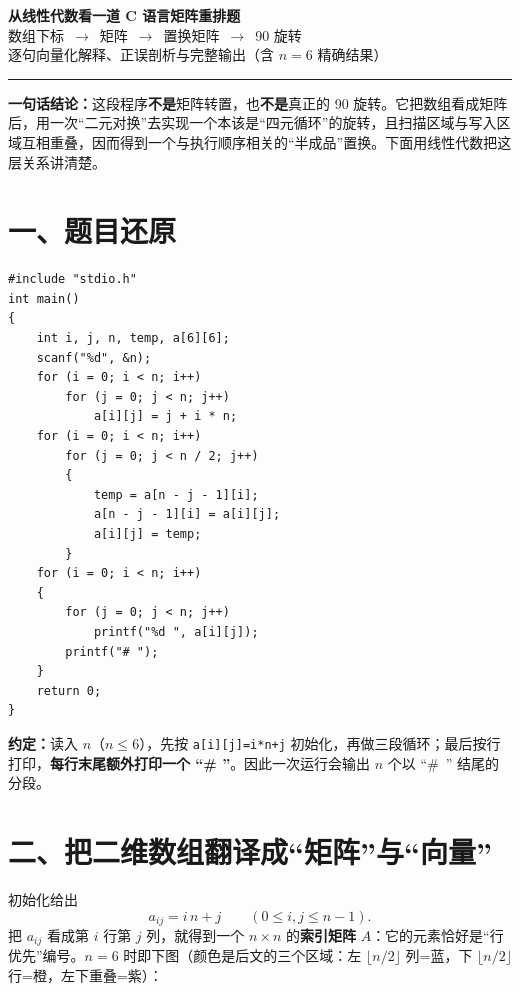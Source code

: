 \documentclass[11pt,a4paper,UTF8]{ctexart}
\begin{document}
\begin{center}
{\LARGE\bfseries 从线性代数看一道 C 语言矩阵重排题}\\[5pt]
{\large 数组下标 \,$\to$\, 矩阵 \,$\to$\, 置换矩阵 \,$\to$\, 90\textdegree{} 旋转}\\[5pt]
{\small 逐句向量化解释、正误剖析与完整输出（含 $n=6$ 精确结果）}
\end{center}
\vspace{-2pt}
\noindent\rule{\linewidth}{0.8pt}

\begin{keybox}
\textbf{一句话结论：}这段程序\textbf{不是}矩阵转置，也\textbf{不是}真正的 90\textdegree{} 旋转。它把数组看成矩阵后，用一次“二元对换”去实现一个本该是“四元循环”的旋转，且扫描区域与写入区域互相重叠，因而得到一个与执行顺序相关的“半成品”置换。下面用线性代数把这层关系讲清楚。
\end{keybox}

\section*{一、题目还原}

\begin{lstlisting}
#include "stdio.h"
int main()
{
    int i, j, n, temp, a[6][6];
    scanf("%d", &n);
    for (i = 0; i < n; i++)
        for (j = 0; j < n; j++)
            a[i][j] = j + i * n;
    for (i = 0; i < n; i++)
        for (j = 0; j < n / 2; j++)
        {
            temp = a[n - j - 1][i];
            a[n - j - 1][i] = a[i][j];
            a[i][j] = temp;
        }
    for (i = 0; i < n; i++)
    {
        for (j = 0; j < n; j++)
            printf("%d ", a[i][j]);
        printf("# ");
    }
    return 0;
}
\end{lstlisting}

\textbf{约定：}读入 $n$（$n\le 6$），先按 \texttt{a[i][j]=i*n+j} 初始化，再做三段循环；最后按行打印，\textbf{每行末尾额外打印一个 “\# ”}。因此一次运行会输出 $n$ 个以 “\#\ ” 结尾的分段。

\section*{二、把二维数组翻译成“矩阵”与“向量”}

初始化给出
\[
a_{ij}=i\,n+j\qquad(0\le i,j\le n-1).
\]
把 $a_{ij}$ 看成第 $i$ 行第 $j$ 列，就得到一个 $n\times n$ 的\textbf{索引矩阵} $A$：它的元素恰好是“行优先”编号。$n=6$ 时即下图（颜色是后文的三个区域：左 $\lfloor n/2\rfloor$ 列=蓝，下 $\lfloor n/2\rfloor$ 行=橙，左下重叠=紫）：
\end{document}
